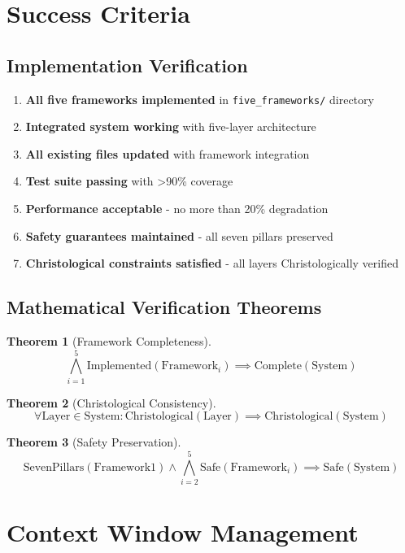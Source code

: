 \documentclass[12pt]{article}
\newtheorem{theorem}{Theorem}
\begin{document}
\section{Success Criteria}

\subsection{Implementation Verification}
\begin{enumerate}
    \item \textbf{All five frameworks implemented} in \texttt{five\_frameworks/} directory
    \item \textbf{Integrated system working} with five-layer architecture
    \item \textbf{All existing files updated} with framework integration
    \item \textbf{Test suite passing} with >90\% coverage
    \item \textbf{Performance acceptable} - no more than 20\% degradation
    \item \textbf{Safety guarantees maintained} - all seven pillars preserved
    \item \textbf{Christological constraints satisfied} - all layers Christologically verified
\end{enumerate}

\subsection{Mathematical Verification Theorems}
\begin{theorem}[Framework Completeness]
\[
\bigwedge_{i=1}^{5} \text{Implemented}(\text{Framework}_i) \implies \text{Complete}(\text{System})
\]
\end{theorem}

\begin{theorem}[Christological Consistency]
\[
\forall \text{Layer} \in \text{System}: \text{Christological}(\text{Layer}) \implies \text{Christological}(\text{System})
\]
\end{theorem}

\begin{theorem}[Safety Preservation]
\[
\text{SevenPillars}(\text{Framework1}) \land \bigwedge_{i=2}^{5} \text{Safe}(\text{Framework}_i) \implies \text{Safe}(\text{System})
\]
\end{theorem}

\section{Context Window Management}
\end{document}
